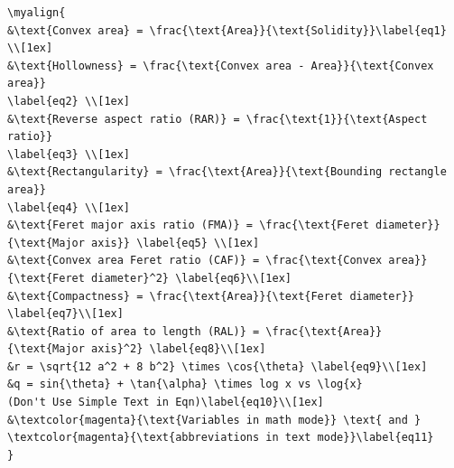 \documentclass[phd]{ndsu-thesis-2022}
\begin{document}
\vspace{1ex}
{\singlespacing
\begin{verbatim}
\myalign{
&\text{Convex area} = \frac{\text{Area}}{\text{Solidity}}\label{eq1} \\[1ex]
&\text{Hollowness} = \frac{\text{Convex area - Area}}{\text{Convex area}} 
\label{eq2} \\[1ex]
&\text{Reverse aspect ratio (RAR)} = \frac{\text{1}}{\text{Aspect ratio}} 
\label{eq3} \\[1ex]
&\text{Rectangularity} = \frac{\text{Area}}{\text{Bounding rectangle area}} 
\label{eq4} \\[1ex]
&\text{Feret major axis ratio (FMA)} = \frac{\text{Feret diameter}}
{\text{Major axis}} \label{eq5} \\[1ex]
&\text{Convex area Feret ratio (CAF)} = \frac{\text{Convex area}}
{\text{Feret diameter}^2} \label{eq6}\\[1ex]
&\text{Compactness} = \frac{\text{Area}}{\text{Feret diameter}} 
\label{eq7}\\[1ex]
&\text{Ratio of area to length (RAL)} = \frac{\text{Area}}
{\text{Major axis}^2} \label{eq8}\\[1ex]
&r = \sqrt{12 a^2 + 8 b^2} \times \cos{\theta} \label{eq9}\\[1ex]
&q = sin{\theta} + \tan{\alpha} \times log x vs \log{x} 
(Don't Use Simple Text in Eqn)\label{eq10}\\[1ex]
&\textcolor{magenta}{\text{Variables in math mode}} \text{ and }  
\textcolor{magenta}{\text{abbreviations in text mode}}\label{eq11}
}
\end{verbatim}
}

\end{document}
